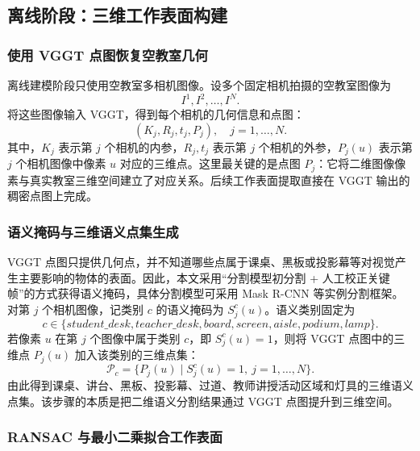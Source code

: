 \documentclass[UTF8,a4paper,zihao=-4]{ctexart}
\begin{document}
\subsection{离线阶段：三维工作表面构建}

\subsubsection{使用 VGGT 点图恢复空教室几何}

离线建模阶段只使用空教室多相机图像。设多个固定相机拍摄的空教室图像为
\begin{equation}
I^1,I^2,\ldots,I^N .
\end{equation}
将这些图像输入 VGGT，得到每个相机的几何信息和点图：
\begin{equation}
\left(K_j,R_j,t_j,P_j\right),\quad j=1,\ldots,N .
\end{equation}
其中，$K_j$ 表示第 $j$ 个相机的内参，$R_j,t_j$ 表示第 $j$ 个相机的外参，$P_j(u)$ 表示第 $j$ 个相机图像中像素 $u$ 对应的三维点。这里最关键的是点图 $P_j$：它将二维图像像素与真实教室三维空间建立了对应关系。后续工作表面提取直接在 VGGT 输出的稠密点图上完成。

\subsubsection{语义掩码与三维语义点集生成}

VGGT 点图只提供几何点，并不知道哪些点属于课桌、黑板或投影幕等对视觉产生主要影响的物体的表面。因此，本文采用“分割模型初分割 + 人工校正关键帧”的方式获得语义掩码，具体分割模型可采用 Mask R-CNN 等实例分割框架\cite{he2017mask}。对第 $j$ 个相机图像，记类别 $c$ 的语义掩码为 $S_j^c(u)$。语义类别固定为
\begin{equation}
c \in \{student\_desk, teacher\_desk, board, screen, aisle, podium, lamp\}.
\end{equation}
若像素 $u$ 在第 $j$ 个图像中属于类别 $c$，即 $S_j^c(u)=1$，则将 VGGT 点图中的三维点 $P_j(u)$ 加入该类别的三维点集：
\begin{equation}
\mathcal{P}_c=\{P_j(u)\mid S_j^c(u)=1,\ j=1,\ldots,N\}.
\end{equation}
由此得到课桌、讲台、黑板、投影幕、过道、教师讲授活动区域和灯具的三维语义点集。该步骤的本质是把二维语义分割结果通过 VGGT 点图提升到三维空间。

\subsubsection{RANSAC 与最小二乘拟合工作表面}
\end{document}

